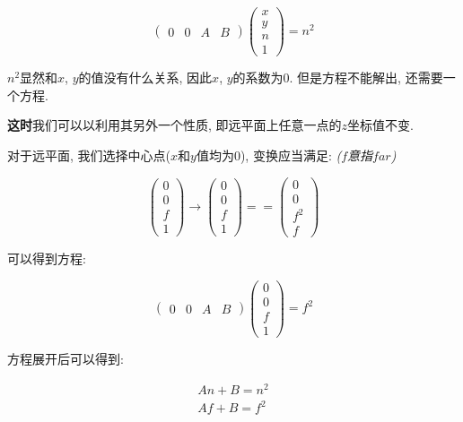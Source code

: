 \begin{equation}
	\begin{pmatrix}0&0&A&B\end{pmatrix}\begin{pmatrix}x\\y\\n\\1\end{pmatrix}=n^2
\end{equation}

$n^2$显然和$x$, $y$的值没有什么关系, 因此$x$, $y$的系数为$0$. 但是方程不能解出, 还需要一个方程. 

\textbf{这时}我们可以以利用其另外一个性质, 即远平面上任意一点的$z$坐标值不变.

对于远平面, 我们选择中心点($x$和$y$值均为$0$), 变换应当满足: \quad\textit{($f$意指$far$)}

\begin{equation}
	\begin{pmatrix}0\\0\\f\\1\end{pmatrix}\rightarrow\begin{pmatrix}0\\0\\f\\1\end{pmatrix}==\begin{pmatrix}0\\0\\f^2\\f\end{pmatrix}
\end{equation}

可以得到方程: 

\begin{equation}
	\begin{pmatrix}0&0&A&B\end{pmatrix}\begin{pmatrix}0\\0\\f\\1\end{pmatrix}=f^2
\end{equation}

方程展开后可以得到: 

\begin{equation}
	\begin{split}
		An+B=n^2\\
		Af+B=f^2
	\end{split}
\end{equation}

